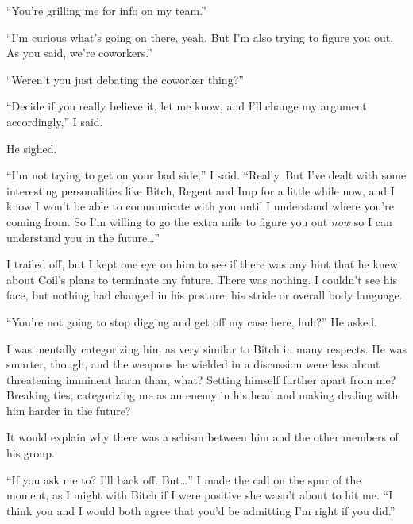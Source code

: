 ``You're grilling me for info on my team.''



``I'm curious what's going on there, yeah.  But I'm also trying to figure you out.  As you said, we're coworkers.''



``Weren't you just debating the coworker thing?''



``Decide if you really believe it, let me know, and I'll change my argument accordingly,'' I said.



He sighed.



``I'm not trying to get on your bad side,'' I said.  ``Really.  But I've dealt with some interesting personalities like Bitch, Regent and Imp for a little while now, and I know I won't be able to communicate with you until I understand where you're coming from.  So I'm willing to go the extra mile to figure you out \emph{now} so I can understand you in the future\ldots''



I trailed off, but I kept one eye on him to see if there was any hint that he knew about Coil's plans to terminate my future.  There was nothing.  I couldn't see his face, but nothing had changed in his posture, his stride or overall body language.



``You're not going to stop digging and get off my case here, huh?''  He asked.



I was mentally categorizing him as very similar to Bitch in many respects.  He was smarter, though, and the weapons he wielded in a discussion were less about threatening imminent harm than, what?  Setting himself further apart from me?  Breaking ties, categorizing me as an enemy in his head and making dealing with him harder in the future?



It would explain why there was a schism between him and the other members of his group.



``If you ask me to?  I'll back off.  But\ldots'' I made the call on the spur of the moment, as I might with Bitch if I were positive she wasn't about to hit me.  ``I think you and I would both agree that you'd be admitting I'm right if you did.''



